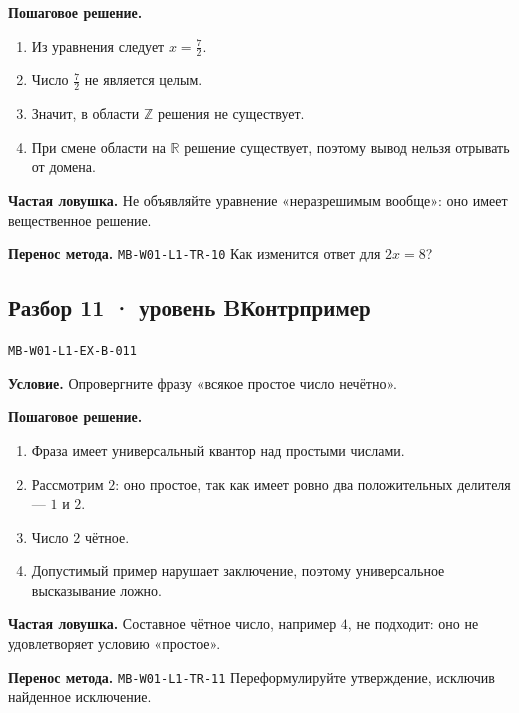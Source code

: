 \documentclass[11pt,a4paper,openany]{book}
\newcommand{\mtag}[1]{\textsf{\small\color{mbaccent}\bfseries #1}}
\newcommand{\muid}[1]{\texttt{\footnotesize #1}}
\begin{document}
\textbf{Пошаговое решение.}\par
\begin{enumerate}[label=\arabic*),leftmargin=*,itemsep=3pt,topsep=4pt]
\item Из уравнения следует $x=\tfrac72$.
\item Число $\tfrac72$ не является целым.
\item Значит, в области $\mathbb Z$ решения не существует.
\item При смене области на $\mathbb R$ решение существует, поэтому вывод нельзя отрывать от домена.
\end{enumerate}


\begin{learnbox}\textbf{Частая ловушка.} Не объявляйте уравнение «неразрешимым вообще»: оно имеет вещественное решение.\par \textbf{Перенос метода.} \muid{MB-W01-L1-TR-10} Как изменится ответ для $2x=8$?\end{learnbox}

\subsection*{\mtag{Разбор 11 · уровень B}\quad Контрпример}\hypertarget{MB-W01-L1-EX-B-011}{}

\muid{MB-W01-L1-EX-B-011}\par

\begin{keybox}\textbf{Условие.} Опровергните фразу «всякое простое число нечётно».\end{keybox}

\textbf{Пошаговое решение.}\par
\begin{enumerate}[label=\arabic*),leftmargin=*,itemsep=3pt,topsep=4pt]
\item Фраза имеет универсальный квантор над простыми числами.
\item Рассмотрим $2$: оно простое, так как имеет ровно два положительных делителя — $1$ и $2$.
\item Число $2$ чётное.
\item Допустимый пример нарушает заключение, поэтому универсальное высказывание ложно.
\end{enumerate}


\begin{learnbox}\textbf{Частая ловушка.} Составное чётное число, например $4$, не подходит: оно не удовлетворяет условию «простое».\par \textbf{Перенос метода.} \muid{MB-W01-L1-TR-11} Переформулируйте утверждение, исключив найденное исключение.\end{learnbox}
\end{document}
